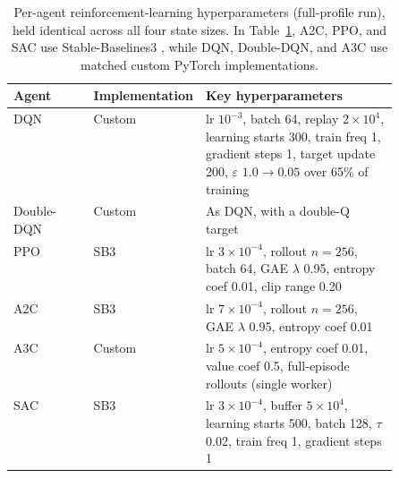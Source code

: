 \documentclass[preprint,review,authoryear,12pt]{elsarticle}
\begin{document}
\begin{table}[H]
    \centering
    \small
    \caption{Per-agent reinforcement-learning hyperparameters (full-profile run), held identical across all four state sizes. In Table~\ref{tab:agent_hyperparams}, A2C, PPO, and SAC use Stable-Baselines3 \citep{stable_baselines3}, while DQN, Double-DQN, and A3C use matched custom PyTorch implementations.}
    \label{tab:agent_hyperparams}
    \begin{tabular}{l l p{0.5\linewidth}}
        \toprule
        Agent      & Implementation & Key hyperparameters                                                                                                                                                          \\
        \midrule
        DQN        & Custom         & lr $10^{-3}$, batch 64, replay $2\times10^{4}$, learning starts 300, train freq 1, gradient steps 1, target update 200, $\varepsilon$ $1.0\!\to\!0.05$ over 65\% of training \\
        Double-DQN & Custom         & As DQN, with a double-Q target                                                                                                                                               \\
        PPO        & SB3            & lr $3\times10^{-4}$, rollout $n=256$, batch 64, GAE $\lambda$ 0.95, entropy coef 0.01, clip range 0.20                                                                       \\
        A2C        & SB3            & lr $7\times10^{-4}$, rollout $n=256$, GAE $\lambda$ 0.95, entropy coef 0.01                                                                                                  \\
        A3C        & Custom         & lr $5\times10^{-4}$, entropy coef 0.01, value coef 0.5, full-episode rollouts (single worker)                                                                                \\
        SAC        & SB3            & lr $3\times10^{-4}$, buffer $5\times10^{4}$, learning starts 500, batch 128, $\tau$ 0.02, train freq 1, gradient steps 1                                                     \\
        \bottomrule
    \end{tabular}
\end{table}

\end{document}
